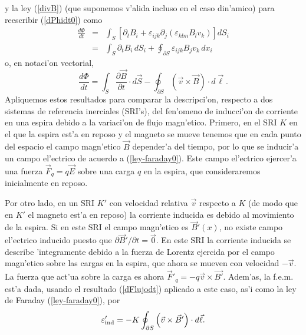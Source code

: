 y la ley (\ref{divB}) (que suponemos v'alida incluso en el caso din'amico) para reescribir (\ref{dPhidt0}) como
\begin{eqnarray}
 \frac{d\Phi}{dt}&=&\int_S\left[\partial_tB_i+\varepsilon_{ijk}
\partial_j(\varepsilon_{klm} B_lv_k)\right] dS_i \\
&=& \int_S\partial_tB_i\, dS_i +\oint_{\partial S}\varepsilon_{ijk}
B_jv_k\,dx_i 
\end{eqnarray}
o, en notaci'on vectorial, 
\begin{equation}\label{dFlujodt}
  \frac{d\Phi}{dt}=\int_S\frac{\partial\vec{B}}{\partial
t}\cdot d\vec{S}-\oint_{\partial
S}\left(\vec{v}\times\vec{B}\right)\cdot d\vec{\ell}.
\end{equation}
Apliquemos estos resultados para comparar la descripci'on, respecto a dos sistemas de referencia inerciales (SRI's), del fen'omeno de inducci'on de corriente en una espira debido a la variaci'on de flujo magn'etico. Primero, en el SRI $K$ en el que la espira est'a en reposo y el magneto se mueve tenemos que en cada punto del espacio el campo magn'etico $\vec{B}$ depender'a del tiempo, por lo que se inducir'a un campo el'ectrico de acuerdo a (\ref{ley-faraday0}). Este campo el'ectrico ejercer'a una fuerza $\vec{F}_q=q\vec{E}$ sobre una carga $q$ en la espira, que consideraremos inicialmente en reposo. 

Por otro lado, en un SRI $K'$ con velocidad relativa $\vec{v}$ respecto a $K$ (de modo que en $K'$ el magneto est'a en reposo) la corriente inducida es debido al movimiento de la espira. Si en este SRI el campo magn'etico es $\vec{B}'(x)$, no existe campo el'ectrico inducido puesto que $\partial\vec{B}'/\partial t=\vec{0}$. En este SRI la corriente inducida se describe 'integramente debido a la fuerza de Lorentz ejercida por el campo magn'etico sobre las cargas en la espira, que ahora se mueven con velocidad $-\vec{v}$. La fuerza que act'ua sobre la carga es ahora $\vec{F}'_q=-q\vec{v}\times\vec{B'}$. Adem'as, la f.e.m. est'a dada, usando el resultado (\ref{dFlujodt}) aplicado a este caso, as'i como la ley de Faraday (\ref{ley-faraday0}), por 
\begin{equation}
\varepsilon'_{\rm ind}=-K\oint_{\partial S}\left(\vec{v}\times\vec{B}'\right)\cdot d\vec{\ell}.
\end{equation}

